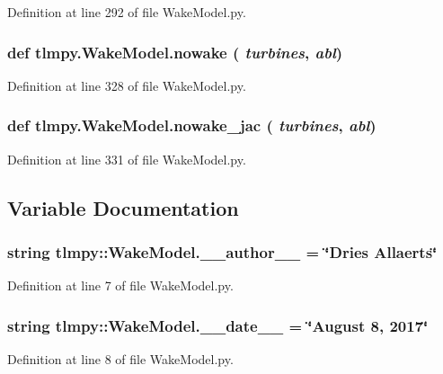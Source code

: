 Definition at line 292 of file WakeModel.py.\hypertarget{namespacetlmpy_1_1WakeModel_a323f039020d6a9dd30d1bc0be305ae1b}{
\subsubsection[{nowake}]{\setlength{\rightskip}{0pt plus 5cm}def tlmpy.WakeModel.nowake ( {\em turbines}, \/   {\em abl})}}
\label{namespacetlmpy_1_1WakeModel_a323f039020d6a9dd30d1bc0be305ae1b}


Definition at line 328 of file WakeModel.py.\hypertarget{namespacetlmpy_1_1WakeModel_a12a39c518292a3d7208a8003b42660f0}{
\subsubsection[{nowake\_\-jac}]{\setlength{\rightskip}{0pt plus 5cm}def tlmpy.WakeModel.nowake\_\-jac ( {\em turbines}, \/   {\em abl})}}
\label{namespacetlmpy_1_1WakeModel_a12a39c518292a3d7208a8003b42660f0}


Definition at line 331 of file WakeModel.py.

\subsection{Variable Documentation}
\hypertarget{namespacetlmpy_1_1WakeModel_ae93b45c36a0ac1bdcfd7431dda66338a}{
\subsubsection[{\_\-\_\-author\_\-\_\-}]{\setlength{\rightskip}{0pt plus 5cm}string {\bf tlmpy::WakeModel.\_\-\_\-author\_\-\_\-} = \char`\"{}Dries Allaerts\char`\"{}}}
\label{namespacetlmpy_1_1WakeModel_ae93b45c36a0ac1bdcfd7431dda66338a}


Definition at line 7 of file WakeModel.py.\hypertarget{namespacetlmpy_1_1WakeModel_ad359221c128f60c6919ae9839ddb0dff}{
\subsubsection[{\_\-\_\-date\_\-\_\-}]{\setlength{\rightskip}{0pt plus 5cm}string {\bf tlmpy::WakeModel.\_\-\_\-date\_\-\_\-} = \char`\"{}August 8, 2017\char`\"{}}}
\label{namespacetlmpy_1_1WakeModel_ad359221c128f60c6919ae9839ddb0dff}


Definition at line 8 of file WakeModel.py.